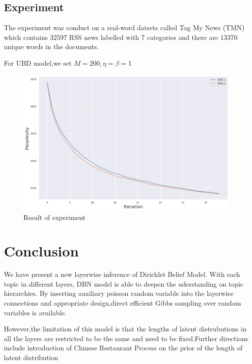 \section {Experiment}

The experiment was conduct on a real-word datsets called Tag My News (TMN) which contains 32597 RSS news labelled with 7 categories and there are 13370 unique words in the documents.

For UBD model,we set $M = 200,\eta = \beta = 1$

\begin{figure}[b]
\includegraphics[width = \linewidth]{res.png}
\caption{Result of experiment}
\label{fig:DirBN Model}
\end{figure}


\chapter{Conclusion}\label{ccl}
We have present a new layerwise inference of Dirichlet Belief Model. With each topic in different layers, DBN model is able to deepen the uderstanding on topic hierarchies. By inserting auxiliary poisson random variable into the layerwise connections and appropriate design,direct efficient Gibbs sampling over random variables is available.

However,the limitation of this model is that the lengths of latent distrubutions in all the layers are restricted to be the same and need to be fixed.Further directions include introduction of Chinese Restaurant Process on the prior of the length of latent distribution
